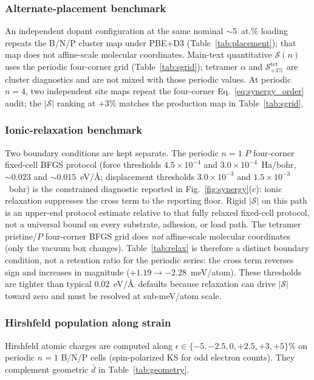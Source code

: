 
\subsubsection{Alternate-placement benchmark}
\label{sec:methods_placement}
An independent dopant configuration at the same nominal ${\sim}5$~at.\% loading repeats the B/N/P cluster map under PBE+D3 (Table~\ref{tab:placement}); that map does not affine-scale molecular coordinates.
Main-text quantitative $\mathcal{S}(n)$ uses the periodic four-corner grid (Table~\ref{tab:sgrid}); tetramer $\alpha$ and $\mathcal{S}_{+3\%}^{\mathrm{tet}}$ are cluster diagnostics and are not mixed with those periodic values.
At periodic $n{=}4$, two independent site maps repeat the four-corner Eq.~\eqref{eq:synergy_order} audit; the $|\mathcal{S}|$ ranking at $+3$\% matches the production map in Table~\ref{tab:sgrid}.

\subsubsection{Ionic-relaxation benchmark}
\label{sec:methods_relax}
Two boundary conditions are kept separate. The periodic $n{=}1$ $P$ four-corner fixed-cell BFGS protocol (force thresholds $4.5\times10^{-4}$ and $3.0\times10^{-4}$~Ha/bohr, ${\sim}0.023$ and ${\sim}0.015$~eV/\AA; displacement thresholds $3.0\times10^{-3}$ and $1.5\times10^{-3}$~bohr) is the constrained diagnostic reported in Fig.~\ref{fig:synergy}(c): ionic relaxation suppresses the cross term to the reporting floor. Rigid $|\mathcal{S}|$ on this path is an upper-end protocol estimate relative to that fully relaxed fixed-cell protocol, not a universal bound on every substrate, adhesion, or load path.
The tetramer pristine/$P$ four-corner BFGS grid does \emph{not} affine-scale molecular coordinates (only the vacuum box changes). Table~\ref{tab:relax} is therefore a distinct boundary condition, not a retention ratio for the periodic series: the cross term reverses sign and increases in magnitude ($+1.19\to-2.28$~meV/atom).
These thresholds are tighter than typical 0.02~eV/\AA\ defaults because relaxation can drive $|\mathcal{S}|$ toward zero and must be resolved at sub-meV/atom scale.

\subsubsection{Hirshfeld population along strain}
\label{sec:methods_population}
Hirshfeld atomic charges are computed along $\epsilon\in\{-5,-2.5,0,+2.5,+3,+5\}$\% on periodic $n{=}1$ B/N/P cells (spin-polarized KS for odd electron counts).
They complement geometric $\bar{d}$ in Table~\ref{tab:geometry}.
